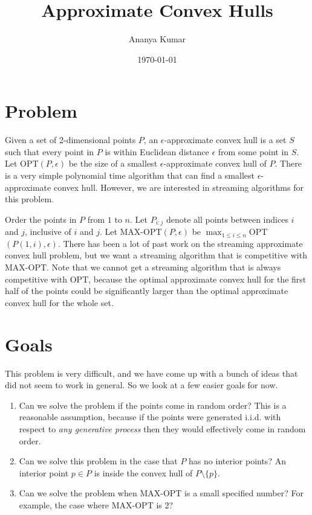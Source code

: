 \documentclass[12pt]{article}
\theoremstyle{definition}
\begin{document}
\title{Approximate Convex Hulls}         %
\author{Ananya Kumar}        %
\date{\today}          %
\maketitle

\section{Problem}

Given a set of 2-dimensional points $P$, an $\epsilon$-approximate convex hull is a set $S$ such that every point in $P$ is within Euclidean distance $\epsilon$ from some point in $S$. Let OPT$(P, \epsilon)$ be the size of a smallest $\epsilon$-approximate convex hull of $P$. There is a very simple polynomial time algorithm that can find a smallest $\epsilon$-approximate convex hull. However, we are interested in streaming algorithms for this problem.

Order the points in $P$ from $1$ to $n$. Let $P_{i:j}$ denote all points between indices $i$ and $j$, inclusive of $i$ and $j$. Let MAX-OPT$(P, \epsilon)$ be $\max_{1 \leq i \leq n} $OPT$(P(1,i), \epsilon)$. There has been a lot of past work on the streaming approximate convex hull problem, but we want a streaming algorithm that is competitive with MAX-OPT. Note that we cannot get a streaming algorithm that is always competitive with OPT, because the optimal approximate convex hull for the first half of the points could be significantly larger than the optimal approximate convex hull for the whole set. 

\section{Goals}

This problem is very difficult, and we have come up with a bunch of ideas that did not seem to work in general. So we look at a few easier goals for now.

\begin{enumerate}
\item Can we solve the problem if the points come in random order? This is a reasonable assumption, because if the points were generated i.i.d. with respect to \emph{any generative process} then they would effectively come in random order.

\item Can we solve this problem in the case that $P$ has no interior points? An interior point $p \in P$ is inside the convex hull of $P \setminus \{p\}$.

\item Can we solve the problem when MAX-OPT is a small specified number? For example, the case where MAX-OPT is 2?

\end{enumerate}
\end{document}
